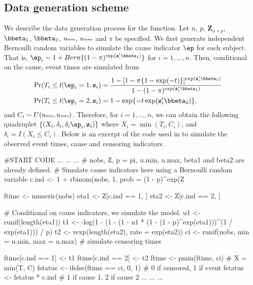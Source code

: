 \begin{appendix}

\section{Data generation scheme} 
\label{app3:data}
We describe the data generation process for the  function. Let $n$, $p$, $\mathbf{Z}_{n \times p}$, $\bbeta_1$, $\bbeta_2$, $u\mbox{\tiny{min}}$, $u\mbox{\tiny{max}}$ and $\pi$ be specified. We first generate independent Bernoulli random variables to simulate the cause indicator $\ep$ for each subject. That is, $\ep_i \sim 1 + Bern\{(1 - \pi)^{\exp(\mathbf{z}_i^\prime \bbeta_1)}\}$ for $i = 1, \ldots, n$. Then, conditional on the cause, event times are simulated from 
\begin{align*}
\Pr(T_i \leq t | \ep_i = 1, \mathbf{z}_i) & = \frac{1 - [1 - \pi\{1 - \exp(-t)\}]^{\exp(\mathbf{z}_i^\prime\bbeta_1)}}{1 - (1 - \pi)^{\exp(\mathbf{z}_i^\prime\bbeta_1)}} \\
\Pr(T_i \leq t | \ep_i = 2, \mathbf{z}_i) & = 1 - \exp\{-t\exp(\mathbf{z}_i^\prime\bbeta_2)\}, \\
\end{align*}
and $C_i \sim U(u\mbox{\tiny{min}}, u\mbox{\tiny{max}})$. Therefore, for $i = 1, \ldots, n$, we can obtain the following quadruplet $\{(X_i, \delta_i, \delta_i \ep_i, \mathbf{z}_i)\}$ where $X_i = \min(T_i, C_i)$,  and $\delta_i = I(X_i \leq C_i)$. Below is an excerpt of the code used in  to simulate the observed event times, cause and censoring indicators.

\begin{example}
#START CODE
...
...
...
# nobs, Z, p = pi, u.min, u.max, beta1 and beta2 are already defined.
# Simulate cause indicators here using a Bernoulli random variable
c.ind <- 1 + rbinom(nobs, 1, prob = (1 - p)^exp(Z %

ftime <- numeric(nobs)
eta1 <- Z[c.ind == 1, ] %
eta2 <- Z[c.ind == 2, ] %

# Conditional on cause indicators, we simulate the model.
u1 <- runif(length(eta1))
t1 <- -log(1 - (1 - (1 - u1 * (1 - (1 - p)^exp(eta1)))^(1 / exp(eta1))) / p)
t2 <- rexp(length(eta2), rate = exp(eta2))
ci <- runif(nobs, min = u.min, max = u.max) # simulate censoring times

ftime[c.ind == 1] <- t1
ftime[c.ind == 2] <- t2 
ftime <- pmin(ftime, ci) # X = min(T, C)
fstatus <- ifelse(ftime == ci, 0, 1) # 0 if censored, 1 if event 
fstatus <- fstatus * c.ind  # 1 if cause 1, 2 if cause 2   
...
...
...            
\end{example}
\end{appendix}

